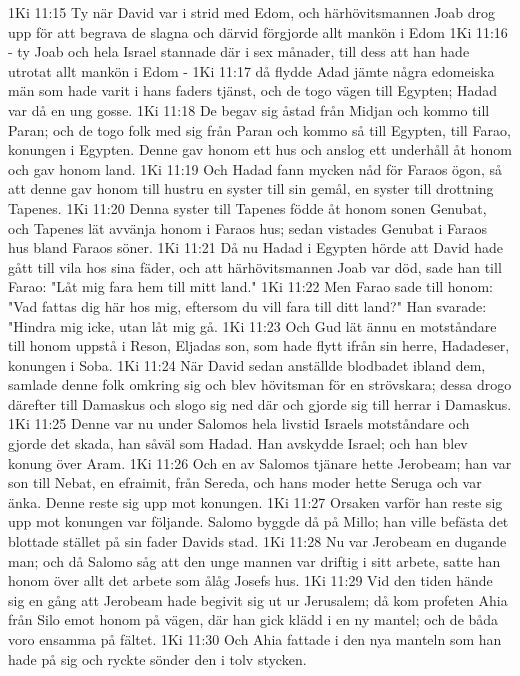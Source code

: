 1Ki 11:15  Ty när David var i strid med Edom, och härhövitsmannen Joab drog upp för att begrava de slagna och därvid förgjorde allt mankön i Edom
1Ki 11:16  - ty Joab och hela Israel stannade där i sex månader, till dess att han hade utrotat allt mankön i Edom -
1Ki 11:17  då flydde Adad jämte några edomeiska män som hade varit i hans faders tjänst, och de togo vägen till Egypten; Hadad var då en ung gosse.
1Ki 11:18  De begav sig åstad från Midjan och kommo till Paran; och de togo folk med sig från Paran och kommo så till Egypten, till Farao, konungen i Egypten. Denne gav honom ett hus och anslog ett underhåll åt honom och gav honom land.
1Ki 11:19  Och Hadad fann mycken nåd för Faraos ögon, så att denne gav honom till hustru en syster till sin gemål, en syster till drottning Tapenes.
1Ki 11:20  Denna syster till Tapenes födde åt honom sonen Genubat, och Tapenes lät avvänja honom i Faraos hus; sedan vistades Genubat i Faraos hus bland Faraos söner.
1Ki 11:21  Då nu Hadad i Egypten hörde att David hade gått till vila hos sina fäder, och att härhövitsmannen Joab var död, sade han till Farao: "Låt mig fara hem till mitt land."
1Ki 11:22  Men Farao sade till honom: "Vad fattas dig här hos mig, eftersom du vill fara till ditt land?" Han svarade: "Hindra mig icke, utan låt mig gå.
1Ki 11:23  Och Gud lät ännu en motståndare till honom uppstå i Reson, Eljadas son, som hade flytt ifrån sin herre, Hadadeser, konungen i Soba.
1Ki 11:24  När David sedan anställde blodbadet ibland dem, samlade denne folk omkring sig och blev hövitsman för en strövskara; dessa drogo därefter till Damaskus och slogo sig ned där och gjorde sig till herrar i Damaskus.
1Ki 11:25  Denne var nu under Salomos hela livstid Israels motståndare och gjorde det skada, han såväl som Hadad. Han avskydde Israel; och han blev konung över Aram.
1Ki 11:26  Och en av Salomos tjänare hette Jerobeam; han var son till Nebat, en efraimit, från Sereda, och hans moder hette Seruga och var änka. Denne reste sig upp mot konungen.
1Ki 11:27  Orsaken varför han reste sig upp mot konungen var följande. Salomo byggde då på Millo; han ville befästa det blottade stället på sin fader Davids stad.
1Ki 11:28  Nu var Jerobeam en dugande man; och då Salomo såg att den unge mannen var driftig i sitt arbete, satte han honom över allt det arbete som ålåg Josefs hus.
1Ki 11:29  Vid den tiden hände sig en gång att Jerobeam hade begivit sig ut ur Jerusalem; då kom profeten Ahia från Silo emot honom på vägen, där han gick klädd i en ny mantel; och de båda voro ensamma på fältet.
1Ki 11:30  Och Ahia fattade i den nya manteln som han hade på sig och ryckte sönder den i tolv stycken.
